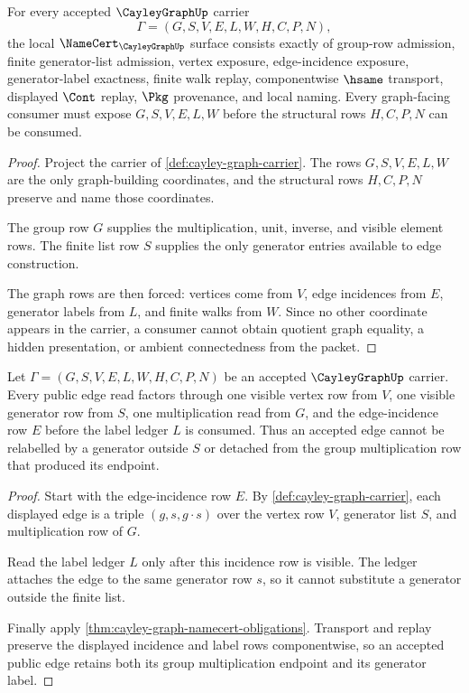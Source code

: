 \begin{theorem}
\label{thm:cayley-graph-namecert-obligations}
For every accepted $\CayleyGraphUp$ carrier
$$
\Gamma=(G,S,V,E,L,W,H,C,P,N),
$$
the local $\NameCert_{\CayleyGraphUp}$ surface consists exactly of group-row admission, finite generator-list admission, vertex exposure, edge-incidence exposure, generator-label exactness, finite walk replay, componentwise $\hsame$ transport, displayed $\Cont$ replay, $\Pkg$ provenance, and local naming. Every graph-facing consumer must expose $G,S,V,E,L,W$ before the structural rows $H,C,P,N$ can be consumed.
\end{theorem}
\begin{proof}
Project the carrier of \autoref{def:cayley-graph-carrier}. The rows $G,S,V,E,L,W$ are the only graph-building coordinates, and the structural rows $H,C,P,N$ preserve and name those coordinates.

The group row $G$ supplies the multiplication, unit, inverse, and visible element rows. The finite list row $S$ supplies the only generator entries available to edge construction.

The graph rows are then forced: vertices come from $V$, edge incidences from $E$, generator labels from $L$, and finite walks from $W$. Since no other coordinate appears in the carrier, a consumer cannot obtain quotient graph equality, a hidden presentation, or ambient connectedness from the packet.
\end{proof}

\begin{theorem}
\label{thm:cayley-graph-edge-label-exactness}
Let $\Gamma=(G,S,V,E,L,W,H,C,P,N)$ be an accepted $\CayleyGraphUp$ carrier. Every public edge read factors through one visible vertex row from $V$, one visible generator row from $S$, one multiplication read from $G$, and the edge-incidence row $E$ before the label ledger $L$ is consumed. Thus an accepted edge cannot be relabelled by a generator outside $S$ or detached from the group multiplication row that produced its endpoint.
\end{theorem}
\begin{proof}
Start with the edge-incidence row $E$. By \autoref{def:cayley-graph-carrier}, each displayed edge is a triple $(g,s,g\cdot s)$ over the vertex row $V$, generator list $S$, and multiplication row of $G$.

Read the label ledger $L$ only after this incidence row is visible. The ledger attaches the edge to the same generator row $s$, so it cannot substitute a generator outside the finite list.

Finally apply \autoref{thm:cayley-graph-namecert-obligations}. Transport and replay preserve the displayed incidence and label rows componentwise, so an accepted public edge retains both its group multiplication endpoint and its generator label.
\end{proof}

